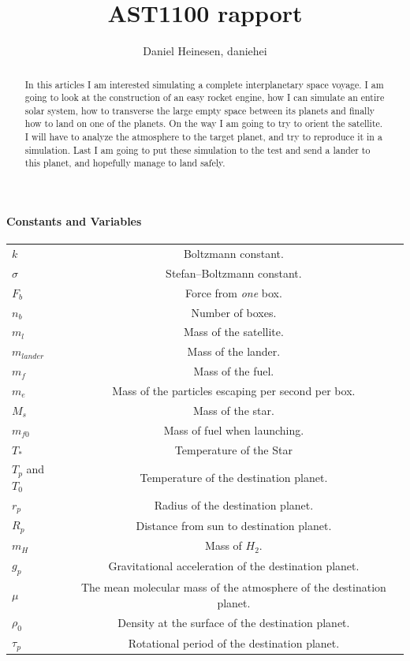 \documentclass[a4paper, 10pt]{article}
\title{AST1100 rapport}
\author{Daniel Heinesen, daniehei}
\begin{document}
\maketitle

\begin{abstract}
In this articles I am interested simulating a complete interplanetary space voyage. I am going to look at the construction of an easy rocket engine, how I can simulate an entire solar system, how to transverse the large empty space between its planets and finally how to land on one of the planets. On the way I am going to try to orient the satellite. I will have to analyze the atmosphere to the target planet, and try to reproduce it in a simulation. Last I am going to put these simulation to the test and send a lander to this planet, and hopefully manage to land safely.
\end{abstract} 

\paragraph*{Constants and Variables}

\begin{center}
\begin{tabular}{l  c}
$k$ & Boltzmann constant.\\
$\sigma$ & Stefan–Boltzmann constant.\\
$F_b$ & Force from \textit{one} box. \\
$n_b$ & Number of boxes.\\
$m_l$ & Mass of the satellite. \\
$m_{lander}$ & Mass of the lander.\\
$m_f$ & Mass of the fuel.\\
$m_e$ & Mass of the particles escaping per second per box. \\
$M_s$ & Mass of the star.\\
$m_{f0}$ & Mass of fuel when launching. \\
$T_*$ & Temperature of the Star\\
$T_p$ and $T_0$ & Temperature of the destination planet. \\
$r_p$ & Radius of the destination planet. \\
$R_p$ & Distance from sun to destination planet. \\
$m_H$ & Mass of $H_2$.\\
$g_p$ & Gravitational acceleration of the destination planet. \\
$\mu$ & The mean molecular mass of the atmosphere of the destination planet.\\
$\rho_0$ & Density at the surface of the destination planet. \\
$\tau_p$ & Rotational period of the destination planet. \\
\end{tabular}
\end{center}
\end{document}
